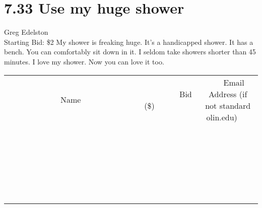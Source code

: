 \documentclass[11pt]{article}
\begin{document}
\section*{7.33 Use my huge shower}
Greg Edelston
\\
Starting Bid: \$2
\newline
My shower is freaking huge. It's a handicapped shower. It has a bench. You can comfortably sit down in it. I seldom take showers shorter than 45 minutes. I love my shower. Now you can love it too.
\\[6ex]
\begin{tabular}{c c c}
~~~~~~~~~~~~~Name~~~~~~~~~~~~~ & ~~~~~~~~~Bid (\$)~~~~~~~~~  & ~~~Email Address (if not standard olin.edu)~~~\\
 & & \\
\hline
 & & \\
\hline
 & & \\
\hline
 & & \\
\hline
 & & \\
\hline
 & & \\
\hline
 & & \\
\hline
 & & \\
\hline
 & & \\
\hline
 & & \\
\hline
 & & \\
\hline
 & & \\
\hline
 & & \\
\hline
 & & \\
\hline
 & & \\
\hline
 & & \\
\hline
 & & \\
\hline
 & & \\
\hline
 & & \\
\hline
 & & \\
\hline
 & & \\
\hline
 & & \\
\hline
 & & \\
\hline
 & & \\
\hline
 & & \\
\hline
 & & \\
\hline
\end{tabular}
\newpage
\end{document}
